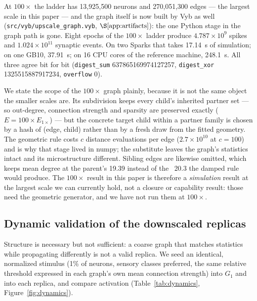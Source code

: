 \documentclass[11pt,a4paper]{article}
\newcommand{\code}[1]{\texttt{\footnotesize #1}}
\newcommand{\gaa}{$G_1$}
\begin{document}
At $100\times$ the ladder has 13{,}925{,}500 neurons and 270{,}051{,}300 edges --- the largest
scale in this paper --- and the graph itself is now built by Vyb as well
(\code{src/vyb/upscale\_graph.vyb}, $\S\ref{app:artifacts}$): the one Python stage in the graph path
is gone. Eight epochs of the $100\times$ ladder produce $4.787\times10^{9}$ spikes and
$1.024\times10^{11}$ synaptic events. On two Sparks that takes 17.14~s of simulation; on one GB10,
37.91~s; on 16 CPU cores of the reference machine, 248.1~s. All three agree bit for bit
(\code{digest\_sum} 637865169974127257, \code{digest\_xor} 1325515887917234, \code{overflow} 0).

\begin{table}[t]
\centering
\caption{The ladder past $10\times$, timed on four devices. Every Vyb GPU number is bit-exact
against the reference (identical spike counts, event counts and both digests); a dash is a scale
that was not run on that device. The C++ reference is single-threaded and was run to $40\times$;
at $80\times$ and $100\times$ the oracle is the Vyb CPU engine, which is bit-identical to the C++
reference at every scale where both were run. Source: \code{results/ladder/split\_runs.json} and
\code{results/energy/vyb\_ladder.json}.}
\label{tab:ladder-gpu}

\end{table}

We state the scope of the $100\times$ graph plainly, because it is not the same object the smaller
scales are. Its subdivision keeps every child's inherited partner set --- so out-degree, connection
strength and sparsity are preserved exactly ($E = 100 \times E_{1\times}$) --- but the concrete
target child within a partner family is chosen by a hash of (edge, child) rather than by a fresh
draw from the fitted geometry. The geometric rule costs $c$ distance evaluations per edge
($2.7\times10^{10}$ at $c=100$) and is why that stage lived in numpy; the substitute leaves the
graph's statistics intact and its microstructure different. Sibling edges are likewise omitted,
which keeps mean degree at the parent's 19.39 instead of the ~20.3 the damped rule would produce.
The $100\times$ result in this paper is therefore a \emph{simulation} result at the largest scale we
can currently hold, not a closure or capability result: those need the geometric generator, and we
have not run them at $100\times$.

\subsection{Dynamic validation of the downscaled replicas}
\label{sec:dynamics}
Structure is necessary but not sufficient: a coarse graph that matches statistics while
propagating differently is not a valid replica. We seed an identical, normalized stimulus (1\% of
neurons, sensory classes preferred, the same relative threshold expressed in each graph's own
mean connection strength) into \gaa{} and into each replica, and compare activation
(Table~\ref{tab:dynamics}, Figure~\ref{fig:dynamics}).
\end{document}

